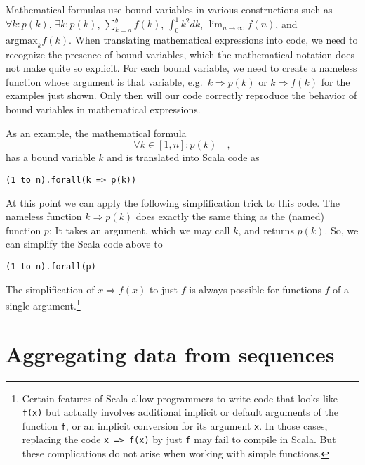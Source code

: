 Mathematical formulas use bound variables in various constructions
such as $\forall k:p(k)$, $\exists k:p(k)$, $\sum_{k=a}^{b}f(k)$,
$\int_{0}^{1}k^{2}dk$, $\lim_{n\rightarrow\infty}f(n)$, and $\text{argmax}_{k}f\left(k\right)$.
When translating mathematical expressions into code, we need to recognize
the presence of bound variables, which the mathematical notation does
not make quite so explicit. For each bound variable, we need to create
a nameless function whose argument is that variable, e.g.\ $k\Rightarrow p(k)$
or $k\Rightarrow f(k)$ for the examples just shown. Only then will
our code correctly reproduce the behavior of bound variables in mathematical
expressions.

As an example, the mathematical formula 
\[
\forall k\in\left[1,n\right]:p\left(k\right)\quad,
\]
has a bound variable $k$ and is translated into Scala code as

\begin{lstlisting}
(1 to n).forall(k => p(k))
\end{lstlisting}
At this point we can apply the following simplification trick to this
code. The nameless function $k\Rightarrow p(k)$ does exactly the
same thing as the (named) function $p$: It takes an argument, which
we may call $k$, and returns $p(k)$. So, we can simplify the Scala
code above to

\begin{lstlisting}
(1 to n).forall(p)
\end{lstlisting}
The simplification of $x\Rightarrow f(x)$ to just $f$ is always
possible for functions $f$ of a single argument.\footnote{Certain features of Scala allow programmers to write code that looks
like \lstinline!f(x)! but
actually involves additional implicit or default arguments of the
function \lstinline!f!,
or an implicit conversion for its argument \lstinline!x!.
In those cases, replacing the code \lstinline!x => f(x)!
by just \lstinline!f! may
fail to compile in Scala. But these complications do not arise when
working with simple functions.}

\section{Aggregating data from sequences}

